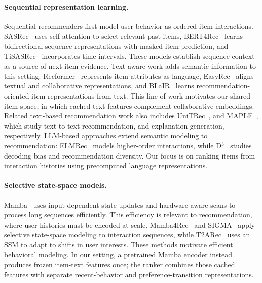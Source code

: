 \documentclass[11pt]{article}
\begin{document}
\paragraph{Sequential representation learning.}
Sequential recommenders first model user behavior as ordered item interactions. SASRec~\citep{SASRec} uses self-attention to select relevant past items, BERT4Rec~\citep{BERT4Rec} learns bidirectional sequence representations with masked-item prediction, and TiSASRec~\citep{TiSASRec} incorporates time intervals. These models establish sequence context as a source of next-item evidence. Text-aware work adds semantic information to this setting: Recformer~\citep{Recformer} represents item attributes as language, EasyRec~\citep{EasyRec} aligns textual and collaborative representations, and BLaIR~\citep{BLaIR} learns recommendation-oriented item representations from text. This line of work motivates our shared item space, in which cached text features complement collaborative embeddings. Related text-based recommendation work also includes UniTRec~\citep{UnitRec}, and MAPLE~\citep{MAPLE}, which study text-to-text recommendation, and explanation generation, respectively. LLM-based approaches extend semantic modeling to recommendation: ELMRec~\citep{ELMRec} models higher-order interactions, while D$^3$~\citep{D3} studies decoding bias and recommendation diversity. Our focus is on ranking items from interaction histories using precomputed language representations.

\paragraph{Selective state-space models.}
Mamba~\citep{Mamba} uses input-dependent state updates and hardware-aware scans to process long sequences efficiently. This efficiency is relevant to recommendation, where user histories must be encoded at scale. Mamba4Rec~\citep{Mamba4Rec} and SIGMA~\citep{SIGMA} apply selective state-space modeling to interaction sequences, while T2ARec~\citep{T2ARec} uses an SSM to adapt to shifts in user interests. These methods motivate efficient behavioral modeling. In our setting, a pretrained Mamba encoder instead produces frozen item-text features once; the ranker combines those cached features with separate recent-behavior and preference-transition representations.
\end{document}
